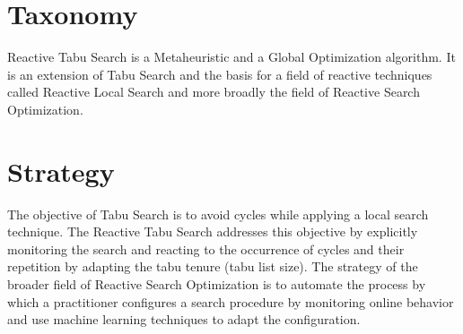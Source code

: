 \documentclass[a4paper, 11pt]{article}
\begin{document}
\section{Taxonomy}
\label{sec:taxonomy}
Reactive Tabu Search is a Metaheuristic and a Global Optimization algorithm.
It is an extension of Tabu Search and the basis for a field of reactive techniques called Reactive Local Search and more broadly the field of Reactive Search Optimization.

\section{Strategy}
\label{sec:strategy}
The objective of Tabu Search is to avoid cycles while applying a local search technique. The Reactive Tabu Search addresses this objective by explicitly monitoring the search and reacting to the occurrence of cycles and their repetition by adapting the tabu tenure (tabu list size).
The strategy of the broader field of Reactive Search Optimization is to automate the process by which a practitioner configures a search procedure by monitoring online behavior and use machine learning techniques to adapt the configuration.

\end{document}
